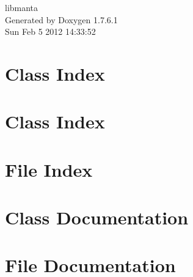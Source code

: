 \documentclass[a4paper]{book}
\begin{document}
\hypersetup{pageanchor=false,citecolor=blue}
\begin{titlepage}
\vspace*{7cm}
\begin{center}
{\Large libmanta }\\
\vspace*{1cm}
{\large \-Generated by Doxygen 1.7.6.1}\\
\vspace*{0.5cm}
{\small Sun Feb 5 2012 14:33:52}\\
\end{center}
\end{titlepage}
\clearemptydoublepage
{}
\tableofcontents
\clearemptydoublepage
{}
\hypersetup{pageanchor=true,citecolor=blue}
\chapter{\-Class \-Index}

\chapter{\-Class \-Index}

\chapter{\-File \-Index}

\chapter{\-Class \-Documentation}












\chapter{\-File \-Documentation}











\printindex
\end{document}
